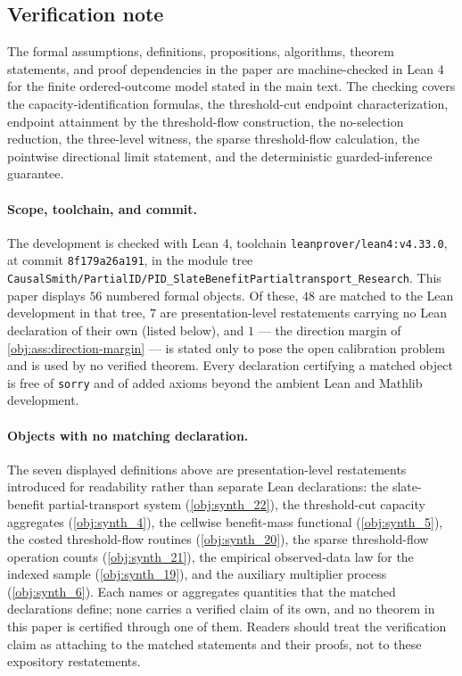 \documentclass[11pt]{article}
\begin{document}
\subsection{Verification note}

The formal assumptions, definitions, propositions, algorithms, theorem statements, and
proof dependencies in the paper are machine-checked in Lean 4 for the finite ordered-outcome model
stated in the main text.  The checking covers the capacity-identification formulas, the
threshold-cut endpoint characterization, endpoint attainment by the threshold-flow construction,
the no-selection reduction, the three-level witness, the sparse threshold-flow calculation, the
pointwise directional limit statement, and the deterministic guarded-inference guarantee.

\paragraph{Scope, toolchain, and commit.}
The development is checked with Lean 4, toolchain \texttt{leanprover/lean4:v4.33.0}, at commit
\texttt{8f179a26a191}, in the module tree
\texttt{CausalSmith/PartialID/PID\_SlateBenefitPartialtransport\_Research}.  This paper displays \(56\)
numbered formal objects.  Of these, \(48\) are matched to the Lean development in that tree, \(7\)
are presentation-level restatements carrying no Lean declaration of their own (listed below), and
\(1\) --- the direction margin of \cref{obj:ass:direction-margin} --- is stated only to pose the
open calibration problem and is used by no verified theorem.  Every declaration certifying a
matched object is free of \texttt{sorry} and of added axioms beyond the ambient Lean and Mathlib
development.

\paragraph{Objects with no matching declaration.}
The seven displayed definitions above are presentation-level restatements introduced for readability rather
than separate Lean declarations: the slate-benefit partial-transport system
(\cref{obj:synth_22}), the threshold-cut capacity aggregates (\cref{obj:synth_4}), the cellwise
benefit-mass functional (\cref{obj:synth_5}), the costed threshold-flow routines
(\cref{obj:synth_20}), the sparse threshold-flow operation counts (\cref{obj:synth_21}), the
empirical observed-data law for the indexed sample (\cref{obj:synth_19}), and the auxiliary
multiplier process (\cref{obj:synth_6}).  Each names or aggregates quantities that the matched
declarations define; none carries a verified claim of its own, and no theorem in this paper is
certified through one of them.  Readers should treat the verification claim as attaching to the
matched statements and their proofs, not to these expository restatements.
\end{document}
